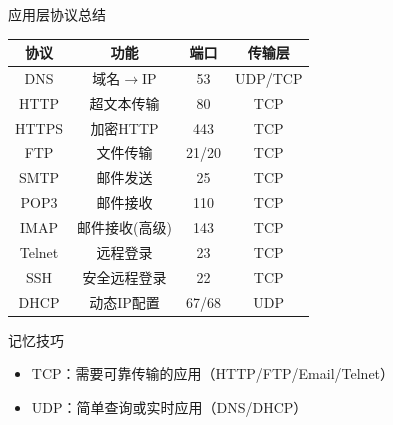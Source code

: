 \documentclass[10pt, aspectratio=169]{beamer}
\begin{document}
\begin{frame}{应用层协议总结}
    \begin{table}
        \centering
        \begin{tabular}{|c|c|c|c|}
            \hline
            \textbf{协议} & \textbf{功能} & \textbf{端口} & \textbf{传输层} \\
            \hline
            DNS & 域名$\rightarrow$IP & 53 & UDP/TCP \\
            HTTP & 超文本传输 & 80 & TCP \\
            HTTPS & 加密HTTP & 443 & TCP \\
            FTP & 文件传输 & 21/20 & TCP \\
            SMTP & 邮件发送 & 25 & TCP \\
            POP3 & 邮件接收 & 110 & TCP \\
            IMAP & 邮件接收(高级) & 143 & TCP \\
            Telnet & 远程登录 & 23 & TCP \\
            SSH & 安全远程登录 & 22 & TCP \\
            DHCP & 动态IP配置 & 67/68 & UDP \\
            \hline
        \end{tabular}
    \end{table}
    \vspace{0.5em}
    \begin{exampleblock}{记忆技巧}
        \begin{itemize}
            \item TCP：需要可靠传输的应用（HTTP/FTP/Email/Telnet）
            \item UDP：简单查询或实时应用（DNS/DHCP）
        \end{itemize}
    \end{exampleblock}
\end{frame}
\end{document}
